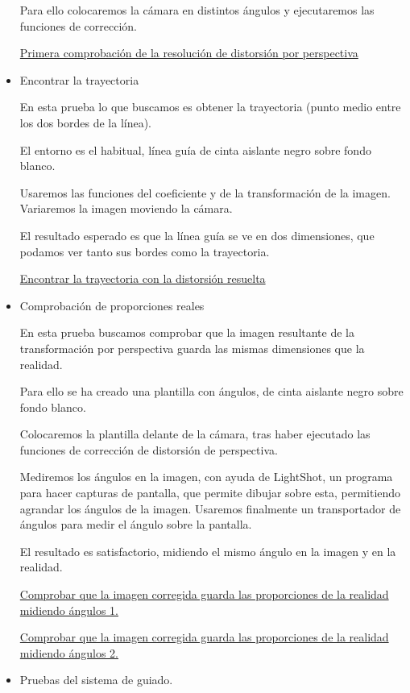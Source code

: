 \begin{itemize}
Para ello colocaremos la cámara en distintos ángulos y ejecutaremos las funciones de corrección.
	
	\href{https://youtu.be/pRE8zerfp7E}{Primera comprobación de la resolución de distorsión por perspectiva}
	
	\item Encontrar la trayectoria
	
	En esta prueba lo que buscamos es obtener la trayectoria (punto medio entre los dos bordes de la línea).
	
El entorno es el habitual, línea guía de cinta aislante negro sobre fondo blanco.

Usaremos las funciones del coeficiente y de la transformación de la imagen. Variaremos la imagen moviendo la cámara.

El resultado esperado es que la línea guía se ve en dos dimensiones, que podamos ver tanto sus bordes como la trayectoria.

	
	\href{https://youtu.be/Ae5aTr3mg6k}{Encontrar la trayectoria con la distorsión resuelta}
	
	\item Comprobación de proporciones reales
	
	En esta prueba buscamos comprobar que la imagen resultante de la transformación por perspectiva guarda las mismas dimensiones que la realidad.
	
Para ello se ha creado una plantilla con ángulos, de cinta aislante negro sobre fondo blanco.

Colocaremos la plantilla delante de la cámara, tras haber ejecutado las funciones de corrección de distorsión de perspectiva.

Mediremos los ángulos en la imagen, con ayuda de LightShot, un programa para hacer capturas de pantalla, que permite dibujar sobre esta, permitiendo agrandar los ángulos de la imagen. Usaremos finalmente un transportador de ángulos para medir el ángulo sobre la pantalla.

El resultado es satisfactorio, midiendo el mismo ángulo en la imagen y en la realidad.
	
	\href{https://youtu.be/wc00piNmfyI}{Comprobar que la imagen corregida guarda las proporciones de la realidad midiendo ángulos 1.}
	
	\href{https://youtu.be/T0djIwql6G8}{Comprobar que la imagen corregida guarda las proporciones de la realidad midiendo ángulos 2.}
	
	\item Pruebas del sistema de guiado. 
	

\end{itemize}
